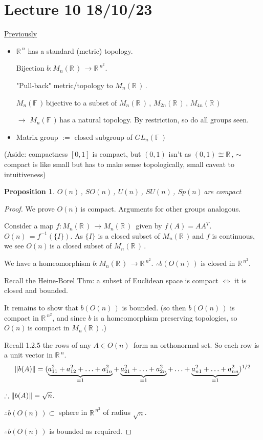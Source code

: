\documentclass[12pt,a4paper]{article}
\newcommand{\rR}{\ensuremath{\mathbb{R}\,}}
\newcommand{\fF}{\ensuremath{\mathbb{F}\,}}
\newcommand{\mnr}{\ensuremath{M_n(\rR)\,}}
\newcommand{\mnf}{\ensuremath{M_n(\fF)\,}}
\newcommand{\mr}[1]{\ensuremath{M_{#1}(\rR)\,}}
\newcommand{\glnff}{\ensuremath{GL_n(\fF)\,}}
\newcommand{\gon}{\ensuremath{O(n)\,}}
\newcommand{\gun}{\ensuremath{U(n)\,}}
\newcommand{\gspn}{\ensuremath{Sp(n)\,}}
\newcommand{\gson}{\ensuremath{SO(n)\,}}
\newcommand{\gsun}{\ensuremath{SU(n)\,}}
\newcommand{\ul}[1]{\underline{#1}}
\newtheorem{prop}[thm]{Proposition}
\begin{document}
\section{Lecture 10 18/10/23}
\ul{Previously} 
\begin{itemize}
\item $\rR^n $ has a standard (metric) topology. 

Bijection $b:\mnr \to \rR^{n^2}$. 

"Pull-back" metric/topology to \mnr.

\mnf bijective to a subset of \mnr, \mr{2n}, \mr{4n} 

$\to$ \mnf has a natural topology. By restriction, so do all groups seen.

\item Matrix group $:=$ closed subgroup of \glnff
\end{itemize}

(Aside: compactness $[0,1]$ is compact, but $(0,1)$ isn't as $(0,1)\cong \rR$, $\sim$ compact is like small but has to make sense topologically, small caveat to intuitiveness)

\begin{prop}
\gon, \gson, \gun, \gsun, \gspn are compact
\end{prop}

\begin{proof}
We prove \gon is compact. Arguments for other groups analogous.

Consider a map $f:\mnr\to\mnr$ given by $f(A)=AA^T$. $\gon=f^{-1}(\{I\})$. As $\{I\}$ is a closed subset of \mnr and $f$ is continuous, we see \gon is a closed subset of \mnr.

We have a homeomorphism $b:\mnr \to \rR^{n^2}$. $\therefore b(\gon)$ is closed in $\rR^{n^2}$.

Recall the Heine-Borel Thm: a subset of Euclidean space is compact $\iff$ it is closed and bounded.

It remains to show that $b(\gon)$ is bounded. (so then $b(\gon)$ is compact in $\rR^{n^2}$, and since $b$ is a homeomorphism preserving topologies, so \gon is compact in \mnr.)

Recall 1.2.5 the rows of any $A\in \gon$ form an orthonormal set. So each row is a unit vector in $\rR^n$. 
\[\norm{b(A)}=(\underbrace{a_{11}^2+a_{12}^2+\ldots +a_{1n}^2}_{=1}+\underbrace{a_{21}^2+\ldots +a_{2n}^2}_{=1}+\ldots+\underbrace{a_{n1}^2+\ldots+a_{nn}^2}_{=1})^{1/2}\]

$\therefore \norm{b(A)}=\sqrt{n}$.

$\therefore b(\gon)\subset$ sphere in $\rR^{n^2}$ of radius $\sqrt{n}$.

$\therefore b(\gon)$ is bounded as required.

\end{proof}
\end{document}
